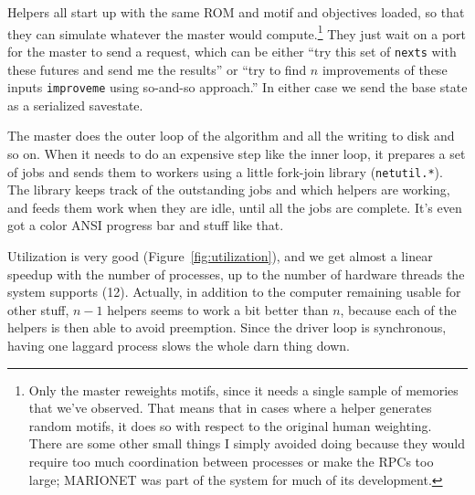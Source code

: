 \documentclass[twocolumn]{article}
\begin{document}
Helpers all start up with the same ROM and motif and objectives
loaded, so that they can simulate whatever the master would
compute.\footnote{Only the master reweights motifs, since it needs a
  single sample of memories that we've observed. That means that in
  cases where a helper generates random motifs, it does so with
  respect to the original human weighting. There are some other small
  things I simply avoided doing because they would require too much
  coordination between processes or make the RPCs too large; MARIONET
  was part of the system for much of its development.} They just wait
on a port for the master to send a request, which can be either ``try
this set of {\tt nexts} with these futures and send me the results'' or
``try to find $n$ improvements of these inputs {\tt improveme} using
so-and-so approach.'' In either case we send the base state as a
serialized savestate.

The master does the outer loop of the algorithm and all the writing to
disk and so on. When it needs to do an expensive step like the inner
loop, it prepares a set of jobs and sends them to workers using a little
fork-join library ({\tt netutil.*}). The library keeps track of the
outstanding jobs and which helpers are working, and feeds them work
when they are idle, until all the jobs are complete. It's even got a
color ANSI progress bar and stuff like that.

Utilization is very good (Figure~\ref{fig:utilization}), and we get
almost a linear speedup with the number of processes, up to the number
of hardware threads the system supports (12). Actually, in addition
to the computer remaining usable for other stuff, $n-1$ helpers seems
to work a bit better than $n$, because each of the helpers is then able
to avoid preemption. Since the driver loop is synchronous, having one
laggard process slows the whole darn thing down.
\end{document}
